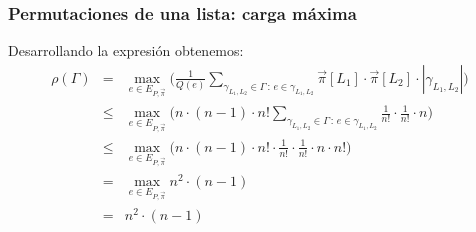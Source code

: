 \documentclass{beamer}
\newcommand{\vs}[1]{\vspace{#1mm}}
\begin{document}
	
	
	\begin{frame}
		\frametitle{Permutaciones de una lista: carga máxima}
		
		{\small
			Desarrollando la expresión obtenemos:
			\begin{eqnarray*}
				\rho(\Gamma) & = & \max_{e \in E_{P,\vec \pi}} \bigg(\frac{1}{Q(e)} \sum_{\gamma_{L_1,L_2} \in \Gamma \,:\, e \in \gamma_{L_1,L_2}} \vec \pi[L_1] \cdot \vec \pi[L_2] \cdot |\gamma_{L_1,L_2}|\bigg)\\
				& \leq &  \max_{e \in E_{P,\vec \pi}} \bigg(n \cdot (n-1) \cdot n! \sum_{\gamma_{L_1,L_2} \in \Gamma \,:\, e \in \gamma_{L_1,L_2}} \frac{1}{n!} \cdot \frac{1}{n!} \cdot n\bigg)\\
				& \leq &  \max_{e \in E_{P,\vec \pi}} \bigg(n \cdot (n-1) \cdot n! \cdot \frac{1}{n!} \cdot \frac{1}{n!} \cdot n \cdot n! \bigg)\\
				& = &  \max_{e \in E_{P,\vec \pi}} n^2 \cdot (n-1)\\
				& = & n^2 \cdot (n-1)
			\end{eqnarray*}
		}
	\end{frame}
	
\end{document}
